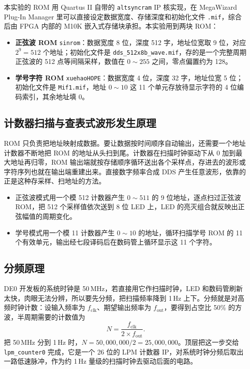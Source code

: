 \documentclass{ctexrep}
\begin{document}
本实验的 ROM 用 Quartus II 自带的 \texttt{altsyncram} IP 核实现，在 MegaWizard Plug-In Manager 里可以直接设定数据宽度、存储深度和初始化文件 \texttt{.mif}，综合后由 FPGA 内部的 M10K 嵌入式存储块承担。本实验用到两块 ROM：

\begin{itemize}
    \item \textbf{正弦波 ROM} \texttt{sinrom}：数据宽度 8 位，深度 512 字，地址位宽取 9 位，对应 $2^9 = 512$ 个地址；初始化文件是 \texttt{dds\_512x8b\_wave.mif}，存的是一个完整周期正弦波的 512 点等间隔采样，数值在 $0\sim255$ 之间，零点偏置约为 128。
    \item \textbf{学号字符 ROM} \texttt{xuehaoHOPE}：数据宽度 4 位，深度 32 字，地址位宽 5 位；初始化文件是 \texttt{Mif1.mif}，地址 $0\sim10$ 这 11 个单元存放待显示字符的 4 位编码索引，其余地址填 0。
\end{itemize}

\subsection{计数器扫描与查表式波形发生原理}

ROM 只负责把地址映射成数据。要让数据按时间顺序自动输出，还需要一个地址计数器不断地把 ROM 的地址从头扫到尾。计数器在扫描时钟驱动下从 0 加到最大地址再归零，ROM 输出端就按存储顺序循环送出各个采样点，存进去的波形或字符序列也就在输出端重建出来。直接数字频率合成 DDS 产生任意波形，依靠的正是这种存采样、扫地址的方法。

\begin{itemize}
    \item 正弦波模式用一个模 512 计数器产生 $0\sim511$ 的 9 位地址，逐点扫过正弦波 ROM，把 512 个采样值依次送到 8 位 LED 上，LED 的亮灭组合就反映出正弦幅值的周期变化。
    \item 学号模式用一个模 11 计数器产生 $0\sim10$ 的地址，循环扫描学号 ROM 的 11 个有效单元，输出经七段译码后在数码管上循环显示这 11 个字符。
\end{itemize}

\subsection{分频原理}

DE0 开发板的系统时钟是 50\,MHz，若直接用它作扫描时钟，LED 和数码管刷新太快，肉眼无法分辨，所以要先分频，把扫描频率降到 1\,Hz 上下。分频就是对高频时钟计数：设输入频率为 $f_{\text{clk}}$、期望输出频率为 $f_{\text{out}}$，要得到占空比 50\% 的方波，半周期需要的计数值为
\[
    N = \frac{f_{\text{clk}}}{2 \times f_{\text{out}}}.
\]
把 50\,MHz 分到 1\,Hz 时，$N = 50{,}000{,}000 / 2 = 25{,}000{,}000$。顶层把这一步交给 \texttt{lpm\_counter0} 完成，它是一个 26 位的 LPM 计数器 IP，对系统时钟分频后取出一路低速脉冲，作为约 1\,Hz 量级的扫描时钟去驱动后面的电路。
\end{document}
